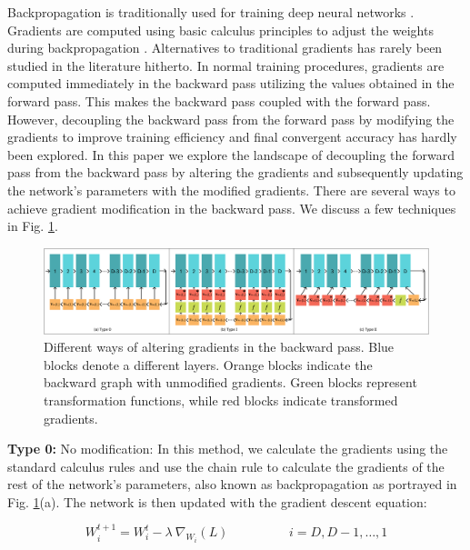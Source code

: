 \documentclass[runningheads]{llncs}
\begin{document}
Backpropagation is traditionally used for training deep neural networks
\cite{lillicrap2020backpropagation}. Gradients are computed using basic calculus
principles to adjust the weights during backpropagation \cite{lecun1988theoretical}.
Alternatives to traditional gradients has rarely been studied in the literature
hitherto. In normal training procedures, gradients are computed immediately in the
backward pass utilizing the values obtained in the forward pass. This makes the backward
pass coupled with the forward pass. However, decoupling the backward pass from the
forward pass by modifying the gradients to improve training efficiency and final
convergent accuracy has hardly been explored. In this paper we explore the landscape of
decoupling the forward pass from the backward pass by altering the gradients and
subsequently updating the network's parameters with the modified gradients. There are
several ways to achieve gradient modification in the backward pass. We discuss a few
techniques in Fig. \ref{fig:gradient_altering}.



\begin{figure}[t]
\centering
\includegraphics[width=\textwidth]{PGT_Types}
\caption{ Different ways of altering gradients in the backward pass. Blue blocks denote
a different layers. Orange blocks indicate the backward graph with unmodified gradients.
Green blocks represent transformation functions, while red blocks indicate transformed
gradients. }
\label{fig:gradient_altering}
\vspace{-0.5cm}
\end{figure}



\textbf{Type 0:} No modification: In this method, we calculate the gradients using the
standard calculus rules and use the chain rule to calculate the gradients of the rest of
the network's parameters, also known as backpropagation as portrayed in Fig.
\ref{fig:gradient_altering}(a). The network is then updated with the gradient descent
equation:

\begin{equation}
W_i^{t+1} = W_i^t - \lambda\ \nabla_{W_i}(L)
\hspace{2cm}
i=D,D-1,\ldots,1
\end{equation}
\end{document}
